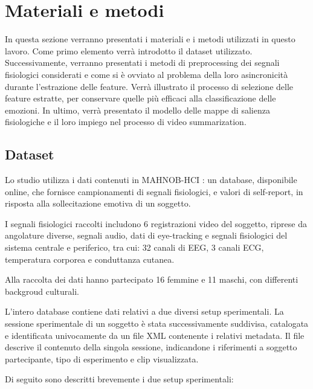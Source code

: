 \section{Materiali e metodi}

In questa sezione verranno presentati i materiali e i metodi utilizzati in questo lavoro. Come primo elemento verrà introdotto il dataset utilizzato. Successivamente, verranno presentati i metodi di preprocessing dei segnali fisiologici considerati e come si è ovviato al problema della loro asincronicità durante l'estrazione delle feature.
Verrà illustrato il processo di selezione delle feature estratte, per conservare quelle più efficaci alla classificazione delle emozioni.
In ultimo, verrà presentato il modello delle mappe di salienza fisiologiche e il loro impiego nel processo di video summarization.

\subsection{Dataset}

Lo studio utilizza i dati contenuti in MAHNOB-HCI \cite{soleymani2011multimodal}: un database, disponibile online, che fornisce campionamenti di segnali fisiologici, e valori di self-report, in risposta alla sollecitazione emotiva di un soggetto.

I segnali fisiologici raccolti includono 6 registrazioni video del soggetto, riprese da angolature diverse, segnali audio, dati di eye-tracking e segnali fisiologici del sistema centrale e periferico, tra cui: 32 canali di EEG, 3 canali ECG, temperatura corporea e conduttanza cutanea.

Alla raccolta dei dati hanno partecipato 16 femmine e 11 maschi, con differenti backgroud culturali.

L'intero database contiene dati relativi a due diversi setup sperimentali. La sessione sperimentale di un soggetto è stata successivamente suddivisa, catalogata e identificata univocamente da un file XML contenente i relativi metadata. Il file descrive il contenuto della singola sessione, indicandone i riferimenti a soggetto partecipante, tipo di esperimento e clip visualizzata.

Di seguito sono descritti brevemente i due setup sperimentali:

